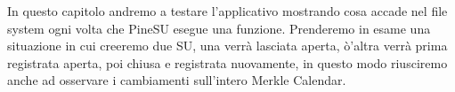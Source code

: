 In questo capitolo andremo a testare l'applicativo mostrando cosa accade nel
file system ogni volta che PineSU esegue una funzione.
Prenderemo in esame una situazione in cui creeremo due SU, una verrà lasciata aperta,
ò'altra verrà prima registrata aperta, poi chiusa e registrata nuovamente, in questo modo
riusciremo anche ad osservare i cambiamenti sull'intero Merkle Calendar.
